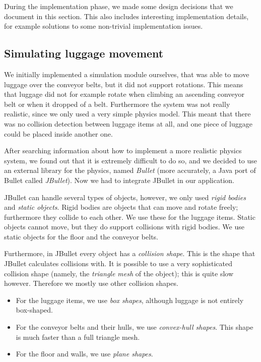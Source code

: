 During the implementation phase, we made some design decisions that we document in this section. This also includes interesting implementation details, for example solutions to some non-trivial implementation issues.

\subsection{Simulating luggage movement}
We initially implemented a simulation module ourselves, that was able to move luggage over the conveyor belts, but it did not support rotations. This means that luggage did not for example rotate when climbing an ascending conveyor belt or when it dropped of a belt. Furthermore the system was not really realistic, since we only used a very simple physics model. This meant that there was no collision detection between luggage items at all, and one piece of luggage could be placed inside another one.

After searching information about how to implement a more realistic physics system, we found out that it is extremely difficult to do so, and we decided to use an external library for the physics, named \emph{Bullet} (more accurately, a Java port of Bullet called \emph{JBullet}). Now we had to integrate JBullet in our application.

JBullet can handle several types of objects, however, we only used \emph{rigid bodies} and \emph{static objects}. Rigid bodies are objects that can move and rotate freely; furthermore they collide to each other. We use these for the luggage items. Static objects cannot move, but they do support collisions with rigid bodies. We use static objects for the floor and the conveyor belts.

Furthermore, in JBullet every object has a \emph{collision shape}. This is the shape that JBullet calculates collisions with. It is possible to use a very sophisticated collision shape (namely, the \emph{triangle mesh} of the object); this is quite slow however. Therefore we mostly use other collision shapes.
\begin{itemize}
 \item For the luggage items, we use \emph{box shapes}, although luggage is not entirely box-shaped.
 \item For the conveyor belts and their hulls, we use \emph{convex-hull shapes}. This shape is much faster than a full triangle mesh.
 \item For the floor and walls, we use \emph{plane shapes}.
\end{itemize}

